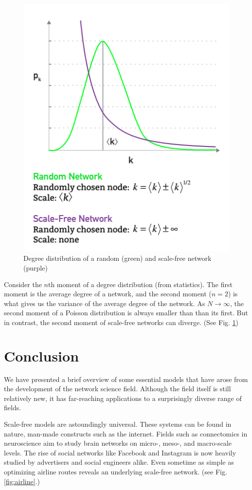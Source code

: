 \documentclass{article}
\begin{document}
\begin{figure}
    \centering
    \includegraphics{ns-random2sf}
    \caption{Degree distribution of a random (green) and scale-free network (purple) \cite{ns}}
    \label{fig:rand2sf}
\end{figure}

Consider the $n$th moment of a degree distribution (from statistics).  The first moment is the average degree of a network, and the second moment ($n=2$) is what gives us the variance of the average degree of the network.  As $N \rightarrow \infty$, the second moment of a Poisson distribution is always smaller than than its first.  But in contrast, the second moment of scale-free networks can diverge. (See Fig. \ref{fig:rand2sf})


\section{Conclusion}
We have presented a brief overview of some essential models that have arose from the development of the network science field.  Although the field itself is still relatively new, it has far-reaching applications to a surprisingly diverse range of fields.  

Scale-free models are astoundingly universal. These systems can be found in nature, man-made constructs such as the internet.  Fields such as connectomics in neuroscience aim to study brain networks on micro-, meso-, and macro-scale levels. The rise of social networks like Facebook and Instagram is now heavily studied by advertisers and social engineers alike. Even sometime as simple as optimizing airline routes reveals an underlying scale-free network. (see Fig. \ref{fig:airline}.)
\end{document}
